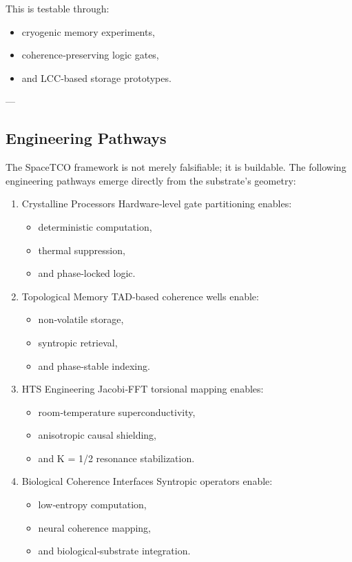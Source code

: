 \documentclass[reprint,amsmath,amssymb,aps,prl,floatfix]{revtex4-2}
\begin{document}
\begin{itemize}
This is testable through:

\begin{itemize}
\item cryogenic memory experiments,  
\item coherence‑preserving logic gates,  
\item and LCC‑based storage prototypes.
\end{itemize}

---

\subsection{Engineering Pathways}

The SpaceTCO framework is not merely falsifiable; it is buildable. The following engineering pathways emerge directly from the substrate’s geometry:
\begin{enumerate}
\item Crystalline Processors
Hardware‑level gate partitioning enables:
\begin{itemize}
\item deterministic computation,  
\item thermal suppression,  
\item and phase‑locked logic.
\end{itemize}

\item Topological Memory
TAD‑based coherence wells enable:
\begin{itemize}
\item non‑volatile storage,  
\item syntropic retrieval,  
\item and phase‑stable indexing.
\end{itemize}

\item HTS Engineering
Jacobi‑FFT torsional mapping enables:
\begin{itemize}
\item room‑temperature superconductivity,  
\item anisotropic causal shielding,  
\item and K = 1/2 resonance stabilization.
\end{itemize}

\item Biological Coherence Interfaces
Syntropic operators enable:
\begin{itemize}
\item low‑entropy computation,  
\item neural coherence mapping,  
\item and biological‑substrate integration.
\end{itemize}
\end{enumerate}


\end{itemize}
\end{document}
